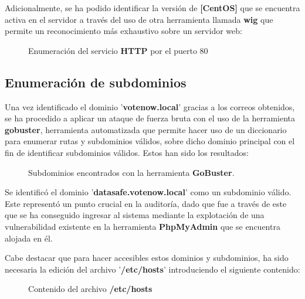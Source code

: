 \documentclass[a4paper]{article} %
\begin{document}
  Adicionalmente, se ha podido identificar la versión de \textbf{[CentOS]} que se encuentra activa en el servidor a través del uso de otra herramienta llamada \textbf{wig} que permite un reconocimiento más exhaustivo sobre un servidor web:


  \begin{figure}[h]
    \centering
    \setlength{\fboxrule}{0.8pt}
    \caption{Enumeración del servicio \textbf{HTTP} por el puerto 80}
  \end{figure}

  \clearpage

  \subsection{Enumeración de subdominios}\label{sec:subdomains}
  Una vez identificado el dominio '\textbf{votenow.local}' gracias a los correos obtenidos, se ha procedido a aplicar un ataque de fuerza bruta con el uso de la herramienta \textbf{gobuster}, herramienta automatizada que permite hacer uso de un diccionario para enumerar rutas y subdominios válidos, sobre dicho dominio principal con el fin de identificar subdominios válidos. Estos han sido los resultados:

  \begin{figure}[h]
    \centering
    \setlength{\fboxrule}{0.8pt}
    \caption{Subdominios encontrados con la herramienta \textbf{GoBuster}.}
  \end{figure}
  
  Se identificó el dominio '\textbf{datasafe.votenow.local}' como un subdominio válido. Este representó un punto crucial en la auditoría, dado que fue a través de este que se ha conseguido ingresar al sistema mediante la explotación de una vulnerabilidad existente en la herramienta \textbf{PhpMyAdmin} que se encuentra alojada en él.

  Cabe destacar que para hacer accesibles estos dominios y subdominios, ha sido necesaria la edición del archivo '\textbf{/etc/hosts}' introduciendo el siguiente contenido:

 \begin{figure}[h]
    \centering
    \setlength{\fboxrule}{0.8pt}
    \caption{Contenido del archivo \textbf{/etc/hosts}}
 \end{figure}
\end{document}
